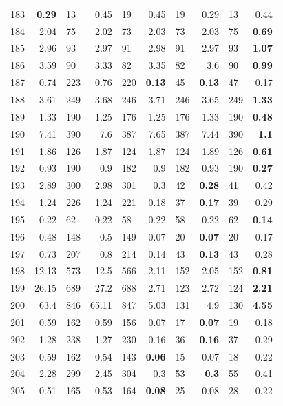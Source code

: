 \begin{longtable}{lr@{\hskip 4pt}l@{\hskip 12pt}r@{\hskip 4pt}l@{\hskip 12pt}r@{\hskip 4pt}l@{\hskip 12pt}r@{\hskip 4pt}l@{\hskip 12pt}r}
183 & \textbf{0.29} & 13 & 0.45 & 19 & 0.45 & 19 & 0.29 & 13 & 0.44 \\
184 & 2.04 & 75 & 2.02 & 73 & 2.03 & 73 & 2.03 & 75 & \textbf{0.69} \\
185 & 2.96 & 93 & 2.97 & 91 & 2.98 & 91 & 2.97 & 93 & \textbf{1.07} \\
186 & 3.59 & 90 & 3.33 & 82 & 3.35 & 82 & 3.6 & 90 & \textbf{0.99} \\
187 & 0.74 & 223 & 0.76 & 220 & \textbf{0.13} & 45 & \textbf{0.13} & 47 & 0.17 \\
188 & 3.61 & 249 & 3.68 & 246 & 3.71 & 246 & 3.65 & 249 & \textbf{1.33} \\
189 & 1.33 & 190 & 1.25 & 176 & 1.25 & 176 & 1.33 & 190 & \textbf{0.48} \\
190 & 7.41 & 390 & 7.6 & 387 & 7.65 & 387 & 7.44 & 390 & \textbf{1.1} \\
191 & 1.86 & 126 & 1.87 & 124 & 1.87 & 124 & 1.89 & 126 & \textbf{0.61} \\
192 & 0.93 & 190 & 0.9 & 182 & 0.9 & 182 & 0.93 & 190 & \textbf{0.27} \\
193 & 2.89 & 300 & 2.98 & 301 & 0.3 & 42 & \textbf{0.28} & 41 & 0.42 \\
194 & 1.24 & 226 & 1.24 & 221 & 0.18 & 37 & \textbf{0.17} & 39 & 0.29 \\
195 & 0.22 & 62 & 0.22 & 58 & 0.22 & 58 & 0.22 & 62 & \textbf{0.14} \\
196 & 0.48 & 148 & 0.5 & 149 & 0.07 & 20 & \textbf{0.07} & 20 & 0.17 \\
197 & 0.73 & 207 & 0.8 & 214 & 0.14 & 43 & \textbf{0.13} & 43 & 0.28 \\
198 & 12.13 & 573 & 12.5 & 566 & 2.11 & 152 & 2.05 & 152 & \textbf{0.81} \\
199 & 26.15 & 689 & 27.2 & 688 & 2.71 & 123 & 2.72 & 124 & \textbf{2.21} \\
200 & 63.4 & 846 & 65.11 & 847 & 5.03 & 131 & 4.9 & 130 & \textbf{4.55} \\
201 & 0.59 & 162 & 0.59 & 156 & 0.07 & 17 & \textbf{0.07} & 19 & 0.18 \\
202 & 1.28 & 238 & 1.27 & 230 & 0.16 & 36 & \textbf{0.16} & 37 & 0.29 \\
203 & 0.59 & 162 & 0.54 & 143 & \textbf{0.06} & 15 & 0.07 & 18 & 0.22 \\
204 & 2.28 & 299 & 2.45 & 304 & 0.3 & 53 & \textbf{0.3} & 55 & 0.41 \\
205 & 0.51 & 165 & 0.53 & 164 & \textbf{0.08} & 25 & 0.08 & 28 & 0.22 \\

\end{longtable}

